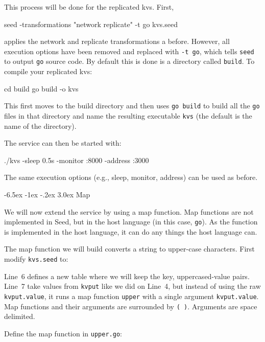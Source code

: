 \documentclass[a5paper,12pt,onecolumn]{article}
\makeatletter
\def\code#1{\mbox{\lstinline{#1}}}
\renewcommand\section{\@startsection {section}{1}{\z@}%
	{-6.5ex \@plus -1ex \@minus -.2ex}%
	{3.0ex}%
	{\sf\Large}}
\makeatother
\begin{document}
This process will be done for the replicated kvs. First,

\begin{cli}
seed -transformations "network replicate" -t go kvs.seed
\end{cli}

applies the network and replicate transformations a before. However, all execution options have been removed and replaced with \code{-t go}, which tells \code{seed} to output \code{go} source code. By default this is done is a directory called \code{build}. To compile your replicated kvs:

\begin{cli}
cd build
go build -o kvs
\end{cli}

This first moves to the build directory and then uses \code{go build} to build all the \code{go} files in that directory and name the resulting executable \code{kvs} (the default is the name of the directory).

The service can then be started with:

\begin{cli}
./kvs -sleep 0.5s -monitor :8000 -address :3000
\end{cli}

The same execution options (e.g., sleep, monitor, address) can be used as before.

\section{Map}

We will now extend the service by using a map function. Map functions are not implemented in Seed, but in the host language (in this case, \code{go}). As the function is implemented in the host language, it can do any things the host language can.

The map function we will build converts a string to upper-case characters. First modify \code{kvs.seed} to:



Line~6 defines a new table where we will keep the key, uppercased-value pairs. Line~7 take values from \code{kvput} like we did on Line~4, but instead of using the raw \code{kvput.value}, it runs a map function \code{upper} with a single argument \code{kvput.value}. Map functions and their arguments are surrounded by \code{( )}. Arguments are space delimited.

Define the map function in \code{upper.go}:
\end{document}
